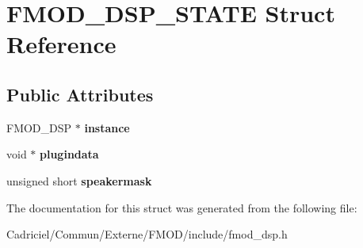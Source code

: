 \hypertarget{struct_f_m_o_d___d_s_p___s_t_a_t_e}{\section{F\-M\-O\-D\-\_\-\-D\-S\-P\-\_\-\-S\-T\-A\-T\-E Struct Reference}
\label{struct_f_m_o_d___d_s_p___s_t_a_t_e}
}
\subsection*{Public Attributes}
\begin{DoxyCompactItemize}
\item 
\hypertarget{struct_f_m_o_d___d_s_p___s_t_a_t_e_a1756ea7b18fdd566e64c64de4151a39c}{F\-M\-O\-D\-\_\-\-D\-S\-P $\ast$ {\bfseries instance}}\label{struct_f_m_o_d___d_s_p___s_t_a_t_e_a1756ea7b18fdd566e64c64de4151a39c}

\item 
\hypertarget{struct_f_m_o_d___d_s_p___s_t_a_t_e_a94293193f1fd65ffc7d72de31e03932c}{void $\ast$ {\bfseries plugindata}}\label{struct_f_m_o_d___d_s_p___s_t_a_t_e_a94293193f1fd65ffc7d72de31e03932c}

\item 
\hypertarget{struct_f_m_o_d___d_s_p___s_t_a_t_e_a98c7cf116176d358e3d26193245f6e19}{unsigned short {\bfseries speakermask}}\label{struct_f_m_o_d___d_s_p___s_t_a_t_e_a98c7cf116176d358e3d26193245f6e19}

\end{DoxyCompactItemize}


The documentation for this struct was generated from the following file\-:\begin{DoxyCompactItemize}
\item 
Cadriciel/\-Commun/\-Externe/\-F\-M\-O\-D/include/fmod\-\_\-dsp.\-h\end{DoxyCompactItemize}
